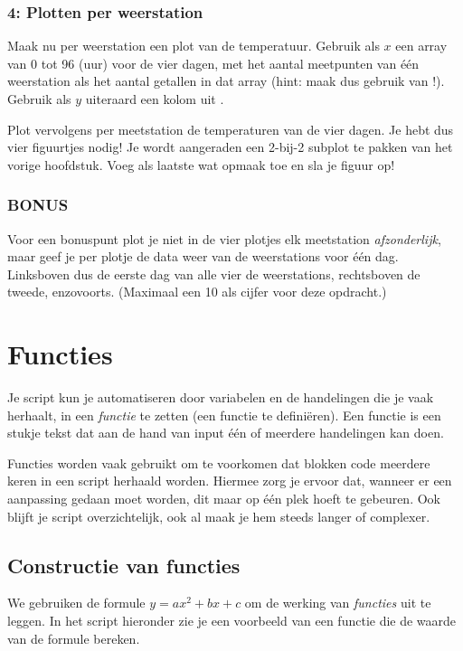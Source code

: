 \documentclass[a4paper,11pt, fleqn]{article}
\newcommand{\ditwc}{Naam van het huidige werkcollege}
\begin{document}
\subsubsection*{4: Plotten per weerstation}
Maak nu per weerstation een plot van de temperatuur. Gebruik als $x$ een array van 0 tot 96 (uur) voor de vier dagen, met het aantal meetpunten van \'e\'en weerstation als het aantal getallen in dat array (hint: maak dus gebruik van !). Gebruik als $y$ uiteraard een kolom uit .

Plot vervolgens per meetstation de temperaturen van de vier dagen. Je hebt dus vier figuurtjes nodig! Je wordt aangeraden een 2-bij-2 subplot te pakken van het vorige hoofdstuk. Voeg als laatste wat opmaak toe en sla je figuur op!

\subsubsection*{BONUS}
Voor een bonuspunt plot je niet in de vier plotjes elk meetstation {\it afzonderlijk}, maar geef je per plotje de data weer van de weerstations voor \'e\'en dag. Linksboven dus de eerste dag van alle vier de weerstations, rechtsboven de tweede, enzovoorts. (Maximaal een 10 als cijfer voor deze opdracht.)

\clearpage
\renewcommand{\ditwc}{Functies}
\section[Functies]{\ditwc}
Je script kun je automatiseren door variabelen en de handelingen die je vaak herhaalt, in een \textit{functie} te zetten (een functie te defini\"eren). Een functie is een stukje tekst dat aan de hand van input \'e\'en of meerdere handelingen kan doen.

Functies worden vaak gebruikt om te voorkomen dat blokken code meerdere keren in een script herhaald worden. 
Hiermee zorg je ervoor dat, wanneer er een aanpassing gedaan moet worden, dit maar op \'e\'en plek hoeft te gebeuren. 
Ook blijft je script overzichtelijk, ook al maak je hem steeds langer of complexer. 

\subsection{Constructie van functies}
We gebruiken de formule $y = a x^2+b x + c$ om de werking van \textit{functies} uit te leggen. In het script hieronder zie je een voorbeeld van een functie die de waarde van de formule bereken.
\end{document}
